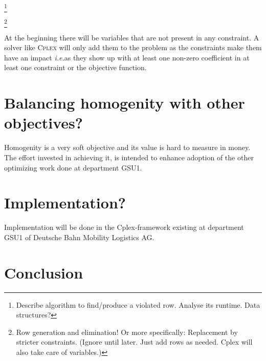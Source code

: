 \documentclass[a4paper]{amsart} %
\def\ie{\emph{i.e.}}
\newcommand{\todo}[1]{\footnote{#1}}
\begin{document}
\todo{Describe algorithm to find/produce a violated row.  Analyse its
  runtime.  Data structures?}

\todo{Row generation and elimination!  Or more specifically:
  Replacement by stricter constraints.  (Ignore until later.  Just add
  rows as needed.  Cplex will also take care of variables.)}

At the beginning there will be variables that are not present in any
constraint.  A solver like \textsc{Cplex} will only add them to the
problem as the constraints make them have an impact \ie as they show
up with at least one non-zero coefficient in at least one constraint
or the objective function.


\section{Balancing homogenity with other objectives?}
Homogenity is a very soft objective and its value is hard to measure
in money.  The effort invested in achieving it, is intended to enhance
adoption of the other optimizing work done at department GSU1.

\section{Implementation?}

Implementation will be done in the Cplex-framework existing at
department GSU1 of Deutsche Bahn Mobility Logistics AG.
\section{Conclusion}
\end{document}
